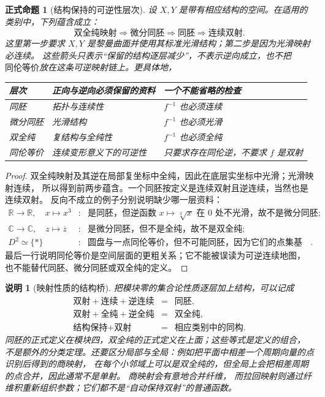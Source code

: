 \documentclass[UTF8,fontset=none,a4paper,11pt]{ctexart}
\theoremstyle{foundation-definition}
\theoremstyle{foundation-theorem}
\theoremstyle{foundation-proposition}
\newtheorem{proposition}[definition]{正式命题}
\theoremstyle{foundation-example}
\theoremstyle{foundation-remark}
\newtheorem{remark}[definition]{说明}
\theoremstyle{foundation-theorem}
\begin{document}
\begin{proposition}[结构保持的可逆性层次]\label{prop:structural-equivalence-hierarchy}
设 \(X,Y\) 是带有相应结构的空间。在适用的类别中，下列蕴含成立：
\[
\text{双全纯映射}
\Longrightarrow
\text{微分同胚}
\Longrightarrow
\text{同胚}
\Longrightarrow
\text{连续双射}.
\]
这里第一步要求 \(X,Y\) 是黎曼曲面并使用其标准光滑结构；第二步是因为光滑映射必连续。
这些箭头只表示“保留的结构逐层减少”，不表示逆向成立，也不把
\(\text{同伦等价}\)放在这条可逆映射链上。更具体地，
\begin{center}
\small
\begin{tabular}{@{}p{}p{}p{}@{}}
\toprule
层次 & 正向与逆向必须保留的资料 & 一个不能省略的检查 \\
\midrule
同胚 & 拓扑与连续性 & \(f^{-1}\) 也必须连续 \\
微分同胚 & 光滑结构 & \(f^{-1}\) 也必须光滑 \\
双全纯 & 复结构与全纯性 & \(f^{-1}\) 也必须全纯 \\
同伦等价 & 连续变形意义下的可逆性 & 只要求存在同伦逆，不要求 \(f\) 是双射 \\
\bottomrule
\end{tabular}
\end{center}
\end{proposition}

\begin{proof}
双全纯映射及其逆在局部复坐标中全纯，因此在底层实坐标中光滑；光滑映射连续，
所以得到前两步蕴含。一个同胚按定义是连续双射且逆连续，当然也是连续双射。
反向不成立的例子分别说明缺少哪一层资料：
\[
\begin{array}{rcl}
\mathbb R\to\mathbb R,\quad x\mapsto x^3
  &:& \text{是同胚，但逆函数 }x\mapsto\sqrt[3]{x}\text{ 在 }0\text{ 处不光滑，故不是微分同胚};\\
\mathbb C\to\mathbb C,\quad z\mapsto\overline z
  &:& \text{是微分同胚，但不是全纯，故不是双全纯};\\
D^2\simeq\{\ast\}
  &:& \text{圆盘与一点同伦等价，但不可能同胚，因为它们的点集基数不同}.
\end{array}
\]
最后一行说明同伦等价是空间层面的更粗关系；它不能被误读为可逆连续地图，
也不能替代同胚、微分同胚或双全纯的定义。
\end{proof}

\begin{remark}[映射性质的结构桥]
把模块零的集合论性质逐层加上结构，可以记成
\[
\begin{array}{rcl}
\text{双射}+\text{连续}+\text{逆连续}&=&\text{同胚},\\
\text{双射}+\text{全纯}+\text{逆全纯}&=&\text{双全纯},\\
\text{结构保持}+\text{双射}&=&\text{相应类别中的同构}.
\end{array}
\]
同胚的正式定义在模块四，双全纯的正式定义在上面；这些等式是定义的组合，
不是额外的分类定理。还要区分局部与全局：例如把平面中相差一个周期向量的点识别后得到的商映射，
在每个小邻域上可以是双全纯的，但全局上会把相差周期的点合并，因此通常不是单射。
商映射会有意地合并纤维，
而拉回映射则通过纤维积重新组织参数；它们都不是“自动保持双射”的普通函数。
\end{remark}
\end{document}
